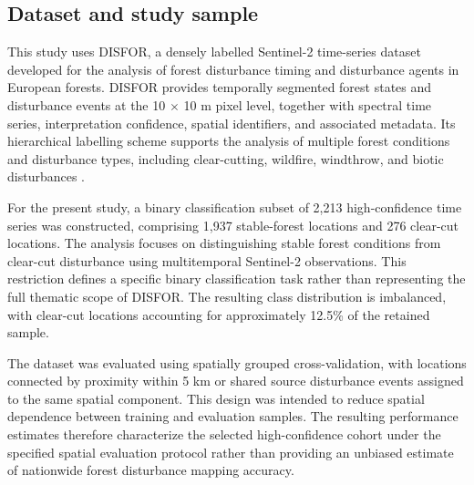 \documentclass[11pt,a4paper]{article}
\begin{document}
\subsection{Dataset and study sample}
This study uses DISFOR, a densely labelled Sentinel-2 time-series dataset developed for the analysis of forest disturbance timing and disturbance agents in European forests. DISFOR provides temporally segmented forest states and disturbance events at the 10 $\times$ 10 m pixel level, together with spectral time series, interpretation confidence, spatial identifiers, and associated metadata. Its hierarchical labelling scheme supports the analysis of multiple forest conditions and disturbance types, including clear-cutting, wildfire, windthrow, and biotic disturbances \cite{ref1}.

For the present study, a binary classification subset of 2,213 high-confidence time series was constructed, comprising 1,937 stable-forest locations and 276 clear-cut locations. The analysis focuses on distinguishing stable forest conditions from clear-cut disturbance using multitemporal Sentinel-2 observations. This restriction defines a specific binary classification task rather than representing the full thematic scope of DISFOR. The resulting class distribution is imbalanced, with clear-cut locations accounting for approximately 12.5\% of the retained sample.

The dataset was evaluated using spatially grouped cross-validation, with locations connected by proximity within 5 km or shared source disturbance events assigned to the same spatial component. This design was intended to reduce spatial dependence between training and evaluation samples. The resulting performance estimates therefore characterize the selected high-confidence cohort under the specified spatial evaluation protocol rather than providing an unbiased estimate of nationwide forest disturbance mapping accuracy.
\end{document}
